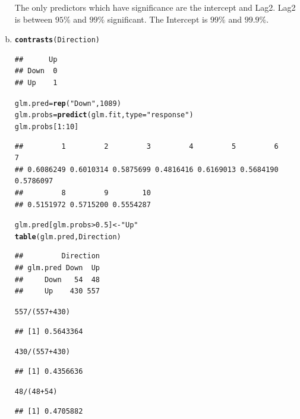 \documentclass{article}\usepackage[]{graphicx}\usepackage[]{color}
\makeatletter
\newcommand{\hlnum}[1]{\textcolor[rgb]{0.686,0.059,0.569}{#1}}%
\newcommand{\hlstr}[1]{\textcolor[rgb]{0.192,0.494,0.8}{#1}}%
\newcommand{\hlopt}[1]{\textcolor[rgb]{0,0,0}{#1}}%
\newcommand{\hlstd}[1]{\textcolor[rgb]{0.345,0.345,0.345}{#1}}%
\newcommand{\hlkwb}[1]{\textcolor[rgb]{0.69,0.353,0.396}{#1}}%
\newcommand{\hlkwc}[1]{\textcolor[rgb]{0.333,0.667,0.333}{#1}}%
\newcommand{\hlkwd}[1]{\textcolor[rgb]{0.737,0.353,0.396}{\textbf{#1}}}%
\newenvironment{kframe}{%
 \def\at@end@of@kframe{}%
 \ifinner\ifhmode%
  \def\at@end@of@kframe{\end{minipage}}%
  \begin{minipage}{\columnwidth}%
 \fi\fi%
 \def\FrameCommand##1{\hskip\@totalleftmargin \hskip-\fboxsep
 \colorbox{shadecolor}{##1}\hskip-\fboxsep
     \hskip-\linewidth \hskip-\@totalleftmargin \hskip\columnwidth}%
 \MakeFramed {\advance\hsize-\width
   \@totalleftmargin\z@ \linewidth\hsize
   \@setminipage}}%
 {\par\unskip\endMakeFramed%
 \at@end@of@kframe}
\newenvironment{knitrout}{}{} %
\makeatother
\begin{document}
\begin{enumerate}[(a)]
The only predictors which have significance are the intercept and Lag2. Lag2 is between $95\%$ and $99\%$ significant. The Intercept is $99\%$ and $99.9\%$.

\item
\begin{knitrout}
\color{fgcolor}\begin{kframe}
\begin{alltt}
\hlkwd{contrasts}\hlstd{(Direction)}
\end{alltt}
\begin{verbatim}
##      Up
## Down  0
## Up    1
\end{verbatim}
\begin{alltt}
\hlstd{glm.pred}\hlkwb{=}\hlkwd{rep}\hlstd{(}\hlstr{"Down"}\hlstd{,} \hlnum{1089}\hlstd{)}
\hlstd{glm.probs}\hlkwb{=}\hlkwd{predict}\hlstd{(glm.fit,}\hlkwc{type}\hlstd{=}\hlstr{"response"}\hlstd{)}
\hlstd{glm.probs[}\hlnum{1}\hlopt{:}\hlnum{10}\hlstd{]}
\end{alltt}
\begin{verbatim}
##         1         2         3         4         5         6         7 
## 0.6086249 0.6010314 0.5875699 0.4816416 0.6169013 0.5684190 0.5786097 
##         8         9        10 
## 0.5151972 0.5715200 0.5554287
\end{verbatim}
\begin{alltt}
\hlstd{glm.pred[glm.probs}\hlopt{>}\hlnum{0.5}\hlstd{]}\hlkwb{<-}\hlstr{"Up"}
\hlkwd{table}\hlstd{(glm.pred,Direction)}
\end{alltt}
\begin{verbatim}
##         Direction
## glm.pred Down  Up
##     Down   54  48
##     Up    430 557
\end{verbatim}
\begin{alltt}
\hlnum{557}\hlopt{/}\hlstd{(}\hlnum{557}\hlopt{+}\hlnum{430}\hlstd{)}
\end{alltt}
\begin{verbatim}
## [1] 0.5643364
\end{verbatim}
\begin{alltt}
\hlnum{430}\hlopt{/}\hlstd{(}\hlnum{557}\hlopt{+}\hlnum{430}\hlstd{)}
\end{alltt}
\begin{verbatim}
## [1] 0.4356636
\end{verbatim}
\begin{alltt}
\hlnum{48}\hlopt{/}\hlstd{(}\hlnum{48}\hlopt{+}\hlnum{54}\hlstd{)}
\end{alltt}
\begin{verbatim}
## [1] 0.4705882
\end{verbatim}
\end{kframe}
\end{knitrout}


\end{enumerate}
\end{document}
